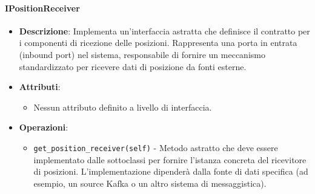 \documentclass[10pt]{article}
\begin{document}
    \paragraph{IPositionReceiver}
    \begin{itemize} 
    \item \textbf{Descrizione}: Implementa un'interfaccia astratta che definisce il contratto per i componenti di ricezione delle posizioni. Rappresenta una porta in entrata (inbound port) nel sistema, responsabile di fornire un meccanismo standardizzato per ricevere dati di posizione da fonti esterne.
    \item \textbf{Attributi}:
    \begin{itemize}
        \item Nessun attributo definito a livello di interfaccia.
    \end{itemize}
    
    \item \textbf{Operazioni}:
    \begin{itemize}
        \item \texttt{get\_position\_receiver(self)} - Metodo astratto che deve essere implementato dalle sottoclassi per fornire l'istanza concreta del ricevitore di posizioni. L'implementazione dipenderà dalla fonte di dati specifica (ad esempio, un source Kafka o un altro sistema di messaggistica).
    \end{itemize}
    \end{itemize}
\end{document}
